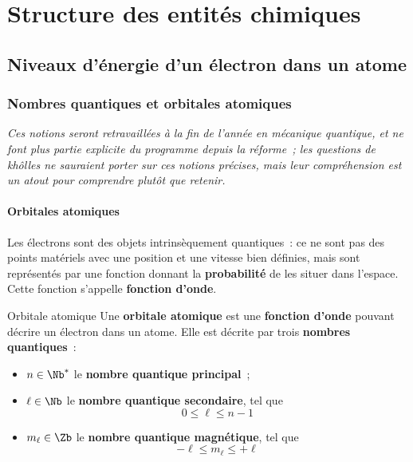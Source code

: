 \documentclass[../main/main.tex]{subfiles}
\begin{document}
\setcounter{chapter}{0}

\chapter{Structure des entit\'es chimiques}

\section{Niveaux d'énergie d'un électron dans un atome}
\subsection{Nombres quantiques et orbitales atomiques}

\begin{center}
    \itshape
    Ces notions seront retravaillées à la fin de l'année en mécanique quantique,
    et ne font plus partie explicite du programme depuis la réforme~; les
    questions de khôlles ne sauraient porter sur ces notions précises, mais leur
    compréhension est un atout pour comprendre plutôt que retenir.
\end{center}

\subsubsection{Orbitales atomiques}

Les électrons sont des objets intrinsèquement quantiques~: ce ne sont pas des
points matériels avec une position et une vitesse bien définies, mais sont
représentés par une fonction donnant la \textbf{probabilité} de les situer dans
l'espace. Cette fonction s'appelle \textbf{fonction d'onde}.

\begin{tdefi}{Orbitale atomique}
    Une \textbf{orbitale atomique} est une \textbf{fonction d'onde} pouvant
    décrire un électron dans un atome. Elle est décrite par trois
    \textbf{nombres quantiques}~:
    \begin{itemize}[label=$\diamond$]
        \item $n \in \Nb^*$ le \textbf{nombre quantique principal}~;
        \item $\ell \in \Nb$ le \textbf{nombre quantique secondaire}, tel que
            \[0\leq\ell\leq n-1\]
        \item $m_{\ell} \in \Zb$ le \textbf{nombre quantique magnétique}, tel
            que
            \[-\ell \leq m_{\ell} \leq +\ell\]
    \end{itemize}
\end{tdefi}
\end{document}
